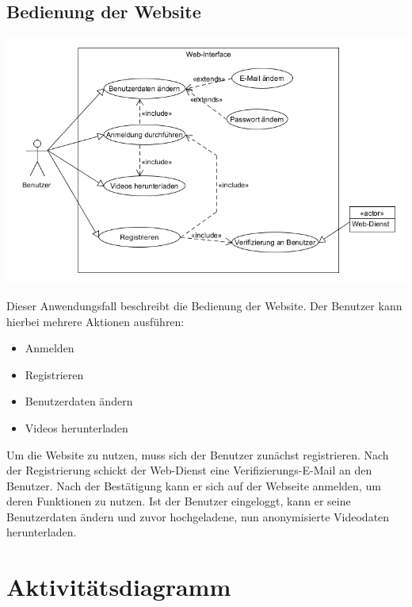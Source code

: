 \subsection{Bedienung der Website}
\begin{center}
\includegraphics[width=1\textwidth]{subtopicsFuncspec/Res/systemModels/WebsiteAWFDiagram.png}
\end{center}	
Dieser Anwendungsfall beschreibt die Bedienung der Website.
Der Benutzer kann hierbei mehrere Aktionen ausführen:
\begin{itemize}
\itemsep0pt
\item Anmelden
\item Registrieren
\item Benutzerdaten ändern
\item Videos herunterladen
\end{itemize}
Um die Website zu nutzen, muss sich der Benutzer zunächst registrieren. Nach der Registrierung schickt der \gls{Web-Dienst} eine Verifizierungs-\gls{E-Mail} an den Benutzer. Nach der Bestätigung kann er sich auf der Webseite anmelden, um deren Funktionen zu nutzen. Ist der Benutzer eingeloggt, kann er seine Benutzerdaten ändern und zuvor hochgeladene, nun anonymisierte Videodaten herunterladen.

\section{Aktivitätsdiagramm}
